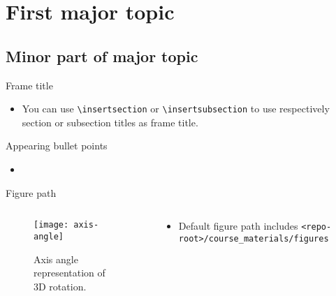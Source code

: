 
\section{First major topic}

  \subsection{Minor part of major topic}

    \begin{frame}{Frame title}
      \begin{itemize}
        \item You can use \texttt{\textbackslash insertsection} or \texttt{\textbackslash insertsubsection} to use respectively section or subsection titles as frame title.
      \end{itemize}
    \end{frame}

    \begin{frame}{Appearing bullet points}
      \begin{itemize}[<+- | alert@+>]
        \item 
      \end{itemize}
    \end{frame}

    \begin{frame}{Figure path}

      \begin{columns}
        \begin{column}{0.5\linewidth}
          \begin{figure}
            \texttt{[image: axis-angle]}
            \caption{Axis angle representation of 3D rotation.}
          \end{figure}
        \end{column}
        \begin{column}{0.5\linewidth}
          \begin{itemize}
            \item Default figure path includes \texttt{<repo-root>/course\_materials/figures}
          \end{itemize}
        \end{column}
      \end{columns}
      
    \end{frame}

